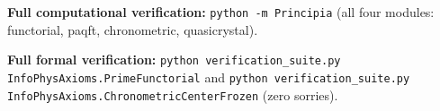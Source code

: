 \noindent\textbf{Full computational verification:} \texttt{python -m Principia} (all four modules: functorial, paqft, chronometric, quasicrystal).

\noindent\textbf{Full formal verification:} \texttt{python verification\_suite.py InfoPhysAxioms.PrimeFunctorial} and \texttt{python verification\_suite.py InfoPhysAxioms.ChronometricCenterFrozen} (zero sorries).
